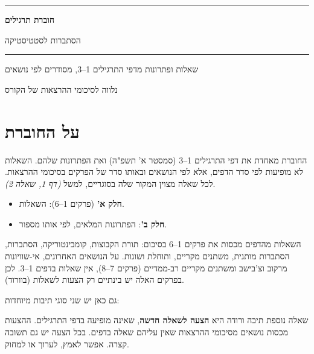 \documentclass[11pt,a4paper]{report}
\begin{document}
\begin{titlepage}
  \centering
  \vspace*{3cm}
  {\sffamily\color{defc}\rule{\linewidth}{1pt}\par\vspace{10pt}
   {\Huge\bfseries חוברת תרגילים\par}\vspace{8pt}
   {\LARGE הסתברות לסטטיסטיקה \par}\vspace{10pt}
   \rule{\linewidth}{1pt}\par}
  \vspace{1.5cm}
  {\large שאלות ופתרונות מדפי התרגילים 1--3, מסודרים לפי נושאים\par}
  \vfill
  {\large נלווה לסיכומי ההרצאות של הקורס\par}
  \vspace{1cm}
\end{titlepage}

\chapter*{על החוברת}

החוברת מאחדת את דפי התרגילים 1--3 (סמסטר א' תשפ"ה) ואת הפתרונות שלהם. השאלות לא מופיעות לפי סדר הדפים, אלא לפי הנושאים ובאותו סדר של הפרקים בסיכומי ההרצאות. לכל שאלה מצוין המקור שלה בסוגריים, למשל \emph{(דף 1, שאלה 2)}.

\begin{itemize}
  \item \textbf{חלק א'} (פרקים 1--6): השאלות.
  \item \textbf{חלק ב'}: הפתרונות המלאים, לפי אותו מספור.
\end{itemize}

השאלות מהדפים מכסות את פרקים 1--6 בסיכום: תורת הקבוצות, קומבינטוריקה, הסתברות, הסתברות מותנית, משתנים מקריים, ותוחלת ושונות. על הנושאים האחרונים, אי-שוויונות מרקוב וצ'בישב ומשתנים מקריים רב-ממדיים (פרקים 7--8), אין שאלות בדפים 1--3. לכן בפרקים האלה יש בינתיים רק הצעות לשאלות (בוורוד).

גם כאן יש שני סוגי תיבות מיוחדות:

\begin{suggestion}{שאלה נוספת}
תיבה ורודה היא \textbf{הצעה לשאלה חדשה}, שאינה מופיעה בדפי התרגילים. ההצעות מכסות נושאים מסיכומי ההרצאות שאין עליהם שאלה בדפים. בכל הצעה יש גם תשובה קצרה. אפשר לאמץ, לערוך או למחוק.
\end{suggestion}
\end{document}
